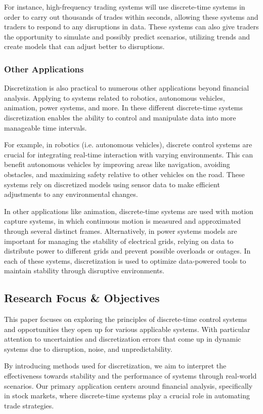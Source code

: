 \documentclass{article}
\begin{document}
For instance, high-frequency trading systems will use discrete-time systems in order to carry out thousands of trades within seconds, allowing these systems and traders to respond to any disruptions in data. These systems can also give traders the opportunity to simulate and possibly predict scenarios, utilizing trends and create models that can adjust better to disruptions.\cite{barmish2011}

\subsubsection{Other Applications}
Discretization is also practical to numerous other applications beyond financial analysis. Applying to systems related to robotics, autonomous vehicles, animation, power systems, and more. In these different discrete-time systems discretization enables the ability to control and manipulate data into more manageable time intervals.

For example, in robotics (i.e. autonomous vehicles), discrete control systems are crucial for integrating real-time interaction with varying environments. This can benefit autonomous vehicles by improving areas like navigation, avoiding obstacles, and maximizing safety relative to other vehicles on the road. These systems rely on discretized models using sensor data to make efficient adjustments to any environmental changes. 

In other applications like animation, discrete-time systems are used with motion capture systems, in which continuous motion is measured and approximated through several distinct frames. Alternatively, in power systems models are important for managing the stability of electrical grids, relying on data to distribute power to different grids and prevent possible overloads or outages. In each of these systems, discretization is used to optimize data-powered tools to maintain stability through disruptive environments.

\subsection{Research Focus \& Objectives}
This paper focuses on exploring the principles of discrete-time control systems and opportunities they open up for various applicable systems. With particular attention to uncertainties and discretization errors that come up in dynamic systems due to disruption, noise, and unpredictability. 

By introducing methods used for discretization, we aim to interpret the effectiveness towards stability and the performance of systems through real-world scenarios. Our primary application centers around financial analysis, specifically in stock markets, where discrete-time systems play a crucial role in automating trade strategies. 
\end{document}
